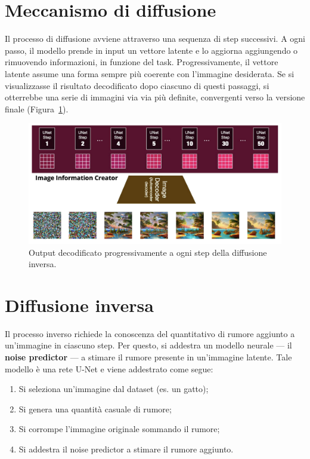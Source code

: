 \section{Meccanismo di diffusione}

Il processo di diffusione avviene attraverso una sequenza di step successivi. A ogni passo, il modello prende in input un vettore latente e lo aggiorna aggiungendo o rimuovendo informazioni, in funzione del task. Progressivamente, il vettore latente assume una forma sempre più coerente con l’immagine desiderata. Se si visualizzasse il risultato decodificato dopo ciascuno di questi passaggi, si otterrebbe una serie di immagini via via più definite, convergenti verso la versione finale (Figura~\ref{fig:stepDiff}).

\begin{figure}
    \centering
    \includegraphics[width=\textwidth]{figure/DiffusionStep.png}
    \caption{Output decodificato progressivamente a ogni step della diffusione inversa.}
    \label{fig:stepDiff}
\end{figure}

\section{Diffusione inversa}

Il processo inverso richiede la conoscenza del quantitativo di rumore aggiunto a un’immagine in ciascuno step. Per questo, si addestra un modello neurale — il \textbf{noise predictor} — a stimare il rumore presente in un’immagine latente. Tale modello è una rete U-Net e viene addestrato come segue:
\begin{enumerate}
    \item Si seleziona un'immagine dal dataset (es. un gatto);
    \item Si genera una quantità casuale di rumore;
    \item Si corrompe l'immagine originale sommando il rumore;
    \item Si addestra il noise predictor a stimare il rumore aggiunto.
\end{enumerate}

